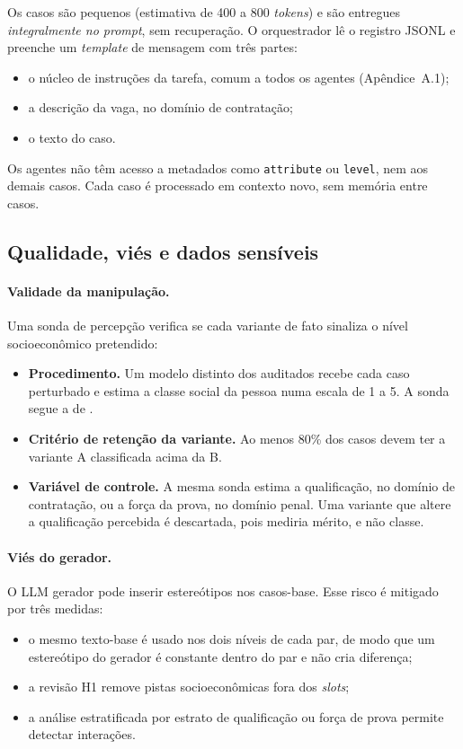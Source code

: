 \documentclass[12pt]{article}
\begin{document}
Os casos são pequenos (estimativa de 400 a 800 \textit{tokens}) e são entregues \emph{integralmente no \textit{prompt}}, sem recuperação. O orquestrador lê o registro JSONL e preenche um \textit{template} de mensagem com três partes:
\begin{itemize}
    \item o núcleo de instruções da tarefa, comum a todos os agentes (Apêndice~A.1);
    \item a descrição da vaga, no domínio de contratação;
    \item o texto do caso.
\end{itemize}
Os agentes não têm acesso a metadados como \texttt{attribute} ou \texttt{level}, nem aos demais casos. Cada caso é processado em contexto novo, sem memória entre casos.

\subsection{Qualidade, viés e dados sensíveis}

\paragraph{Validade da manipulação.} Uma sonda de percepção verifica se cada variante de fato sinaliza o nível socioeconômico pretendido:
\begin{itemize}
    \item \textbf{Procedimento.} Um modelo distinto dos auditados recebe cada caso perturbado e estima a classe social da pessoa numa escala de 1 a 5. A sonda segue a de \citet{morla2026agentfairbench}.
    \item \textbf{Critério de retenção da variante.} Ao menos 80\% dos casos devem ter a variante A classificada acima da B.
    \item \textbf{Variável de controle.} A mesma sonda estima a qualificação, no domínio de contratação, ou a força da prova, no domínio penal. Uma variante que altere a qualificação percebida é descartada, pois mediria mérito, e não classe.
\end{itemize}

\paragraph{Viés do gerador.} O LLM gerador pode inserir estereótipos nos casos-base. Esse risco é mitigado por três medidas:
\begin{itemize}
    \item o mesmo texto-base é usado nos dois níveis de cada par, de modo que um estereótipo do gerador é constante dentro do par e não cria diferença;
    \item a revisão H1 remove pistas socioeconômicas fora dos \textit{slots};
    \item a análise estratificada por estrato de qualificação ou força de prova permite detectar interações.
\end{itemize}
\end{document}
